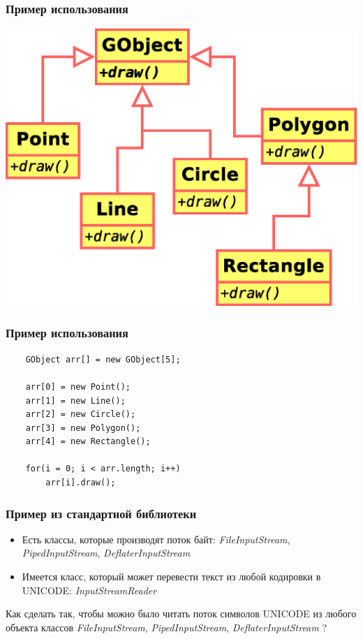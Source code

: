 \begin{frame}
	\frametitle{Пример использования}

	\includegraphics[width=0.9\linewidth]{lesson-4-Diagram5.eps}
\end{frame}

\begin{frame}[fragile]
	\frametitle{Пример использования}

	\begin{large}
	\begin{verbatim}
	GObject arr[] = new GObject[5];

	arr[0] = new Point();
	arr[1] = new Line();
	arr[2] = new Circle();
	arr[3] = new Polygon();
	arr[4] = new Rectangle();

	for(i = 0; i < arr.length; i++)
	    arr[i].draw();
	\end{verbatim}
	\end{large}
\end{frame}

\begin{frame}
	\frametitle{Пример из стандартной библиотеки}

	\begin{Large}
	\begin{itemize}
	\item{Есть классы, которые производят поток байт: \emph{FileInputStream}, \emph{PipedInputStream}, \emph{DeflaterInputStream}}
	\item{Имеется класс, который может перевести текст из любой кодировки в UNICODE: \emph{InputStreamReader}}
	\end{itemize}

	Как сделать так, чтобы можно было читать поток символов UNICODE из любого объекта классов \emph{FileInputStream}, \emph{PipedInputStream}, \emph{DeflaterInputStream} ?
	\end{Large}
\end{frame}

